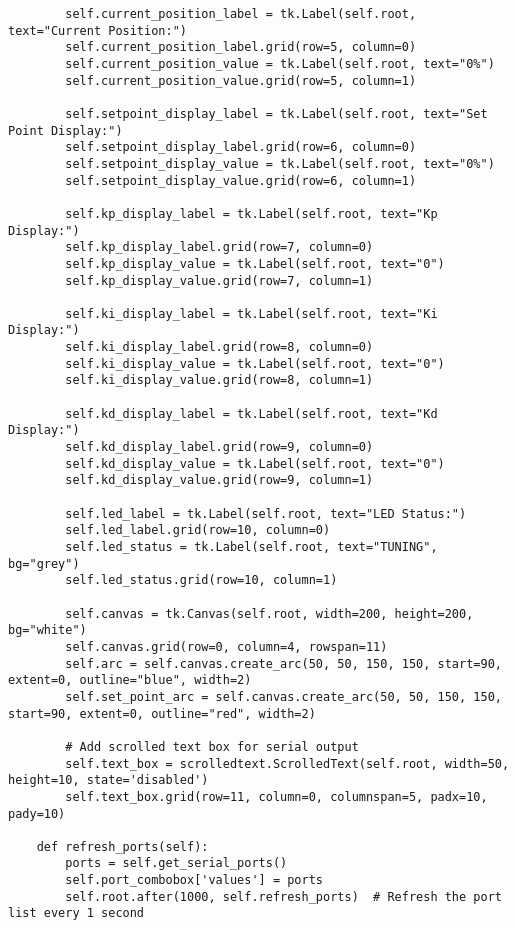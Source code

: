 \documentclass{article}
\begin{document}
\begin{verbatim}
        self.current_position_label = tk.Label(self.root, text="Current Position:")
        self.current_position_label.grid(row=5, column=0)
        self.current_position_value = tk.Label(self.root, text="0%")
        self.current_position_value.grid(row=5, column=1)

        self.setpoint_display_label = tk.Label(self.root, text="Set Point Display:")
        self.setpoint_display_label.grid(row=6, column=0)
        self.setpoint_display_value = tk.Label(self.root, text="0%")
        self.setpoint_display_value.grid(row=6, column=1)

        self.kp_display_label = tk.Label(self.root, text="Kp Display:")
        self.kp_display_label.grid(row=7, column=0)
        self.kp_display_value = tk.Label(self.root, text="0")
        self.kp_display_value.grid(row=7, column=1)

        self.ki_display_label = tk.Label(self.root, text="Ki Display:")
        self.ki_display_label.grid(row=8, column=0)
        self.ki_display_value = tk.Label(self.root, text="0")
        self.ki_display_value.grid(row=8, column=1)

        self.kd_display_label = tk.Label(self.root, text="Kd Display:")
        self.kd_display_label.grid(row=9, column=0)
        self.kd_display_value = tk.Label(self.root, text="0")
        self.kd_display_value.grid(row=9, column=1)

        self.led_label = tk.Label(self.root, text="LED Status:")
        self.led_label.grid(row=10, column=0)
        self.led_status = tk.Label(self.root, text="TUNING", bg="grey")
        self.led_status.grid(row=10, column=1)

        self.canvas = tk.Canvas(self.root, width=200, height=200, bg="white")
        self.canvas.grid(row=0, column=4, rowspan=11)
        self.arc = self.canvas.create_arc(50, 50, 150, 150, start=90, extent=0, outline="blue", width=2)
        self.set_point_arc = self.canvas.create_arc(50, 50, 150, 150, start=90, extent=0, outline="red", width=2)

        # Add scrolled text box for serial output
        self.text_box = scrolledtext.ScrolledText(self.root, width=50, height=10, state='disabled')
        self.text_box.grid(row=11, column=0, columnspan=5, padx=10, pady=10)

    def refresh_ports(self):
        ports = self.get_serial_ports()
        self.port_combobox['values'] = ports
        self.root.after(1000, self.refresh_ports)  # Refresh the port list every 1 second


\end{verbatim}
\end{document}
